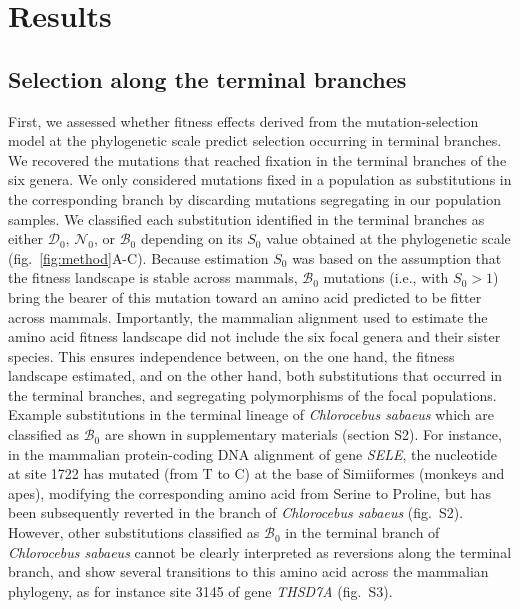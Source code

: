 \documentclass{article}
\newcommand{\Sphy}{S_{0}}
\newcommand{\SphyDel}{\mathcal{D}_0}
\newcommand{\SphyNeu}{\mathcal{N}_0}
\newcommand{\SphyBen}{\mathcal{B}_0}
\begin{document}
    \section*{Results}

    \subsection*{Selection along the terminal branches}
    First, we assessed whether fitness effects derived from the mutation-selection model at the phylogenetic scale predict selection occurring in terminal branches.
    We recovered the mutations that reached fixation in the terminal branches of the six genera.
    We only considered mutations fixed in a population as substitutions in the corresponding branch by discarding mutations segregating in our population samples.
    We classified each substitution identified in the terminal branches as either $\SphyDel$, $\SphyNeu$, or $\SphyBen$ depending on its $\Sphy$ value obtained at the phylogenetic scale (fig.~\ref{fig:method}A-C).
    Because estimation $\Sphy$ was based on the assumption that the fitness landscape is stable across mammals, $\SphyBen$ mutations (i.e., with $\Sphy>1$) bring the bearer of this mutation toward an amino acid predicted to be fitter across mammals.
    Importantly, the mammalian alignment used to estimate the amino acid fitness landscape did not include the six focal genera and their sister species.
    This ensures independence between, on the one hand, the fitness landscape estimated, and on the other hand, both substitutions that occurred in the terminal branches, and segregating polymorphisms of the focal populations.
    Example substitutions in the terminal lineage of \textit{Chlorocebus sabaeus} which are classified as $\SphyBen$ are shown in supplementary materials (section S2).
    For instance, in the mammalian protein-coding DNA alignment of gene \textit{SELE}, the nucleotide at site 1722 has mutated (from T to C) at the base of Simiiformes (monkeys and apes), modifying the corresponding amino acid from Serine to Proline, but has been subsequently reverted in the branch of \textit{Chlorocebus sabaeus} (fig.~S2).
    However, other substitutions classified as $\SphyBen$ in the terminal branch of \textit{Chlorocebus sabaeus} cannot be clearly interpreted as reversions along the terminal branch, and show several transitions to this amino acid across the mammalian phylogeny, as for instance site 3145 of gene \textit{THSD7A} (fig.~S3).
\end{document}
